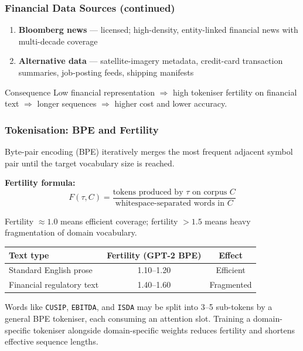 \documentclass[9pt,t]{beamer}
\begin{document}
\begin{frame}
\frametitle{Financial Data Sources (continued)}

\begin{enumerate}
  \item[3.] \textbf{Bloomberg news} --- licensed; high-density, entity-linked financial
        news with multi-decade coverage
  \item[4.] \textbf{Alternative data} --- satellite-imagery metadata, credit-card
        transaction summaries, job-posting feeds, shipping manifests
\end{enumerate}

\medskip
\begin{alertblock}{Consequence}
  Low financial representation $\Rightarrow$ high tokeniser fertility on financial
  text $\Rightarrow$ longer sequences $\Rightarrow$ higher cost and lower accuracy.
\end{alertblock}
\end{frame}

\begin{frame}
\frametitle{Tokenisation: BPE and Fertility}

Byte-pair encoding (BPE) iteratively merges the most frequent adjacent symbol pair
until the target vocabulary size is reached.

\medskip
\textbf{Fertility formula:}
\[
  F(\tau, C) = \frac{\text{tokens produced by } \tau \text{ on corpus } C}
                    {\text{whitespace-separated words in } C}
\]

\medskip
Fertility $\approx 1.0$ means efficient coverage; fertility $> 1.5$ means heavy
fragmentation of domain vocabulary.

\medskip
\begin{center}
\begin{tabular}{lcc}
\toprule
\textbf{Text type} & \textbf{Fertility (GPT-2 BPE)} & \textbf{Effect} \\
\midrule
Standard English prose  & 1.10--1.20 & Efficient \\
Financial regulatory text & 1.40--1.60 & Fragmented \\
\bottomrule
\end{tabular}
\end{center}

\medskip
Words like \texttt{CUSIP}, \texttt{EBITDA}, and \texttt{ISDA} may be split into
3--5 sub-tokens by a general BPE tokeniser, each consuming an attention slot.
Training a domain-specific tokeniser alongside domain-specific weights reduces
fertility and shortens effective sequence lengths.
\end{frame}
\end{document}
